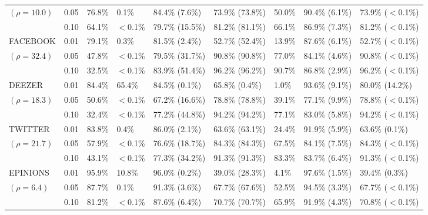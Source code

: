 \documentclass[a4paper,10pt]{article}
\theoremstyle{plain}
\begin{document}
{\begin{table}[h]
{\begin{tabular}{|ll|ll|lll|ll|}
				$(\rho=10.0)$& 0.05& 76.8\% & 0.1\%& 84.4\% (7.6\%) & 73.9\% (73.8\%) & 50.0\%& 90.4\% (6.1\%) & 73.9\% ($<$0.1\%)
				\\
				& 0.10& 64.1\% & $<$0.1\%& 79.7\% (15.5\%) & 81.2\% (81.1\%) & 66.1\%& 86.9\% (7.3\%) & 81.2\% ($<$0.1\%)
				\\
				FACEBOOK & 0.01& 79.1\% & 0.3\%& 81.5\% (2.4\%) & 52.7\% (52.4\%) & 13.9\%& 87.6\% (6.1\%) & 52.7\% ($<$0.1\%)
				\\
				$(\rho=32.4)$& 0.05& 47.8\% & $<$0.1\%& 79.5\% (31.7\%) & 90.8\% (90.8\%) & 77.0\%& 84.1\% (4.6\%) & 90.8\% ($<$0.1\%)
				\\
				& 0.10& 32.5\% & $<$0.1\%& 83.9\% (51.4\%) & 96.2\% (96.2\%) & 90.7\%& 86.8\% (2.9\%) & 96.2\% ($<$0.1\%)
				\\
				DEEZER   & 0.01& 84.4\% & 65.4\%& 84.5\% (0.1\%) & 65.8\% (0.4\%) & 1.0\%& 93.6\% (9.1\%) & 80.0\% (14.2\%)
				\\
				$(\rho=18.3)$& 0.05& 50.6\% & $<$0.1\%& 67.2\% (16.6\%) & 78.8\% (78.8\%) & 39.1\%& 77.1\% (9.9\%) & 78.8\% ($<$0.1\%)
				\\
				& 0.10& 32.4\% & $<$0.1\%& 77.2\% (44.8\%) & 94.2\% (94.2\%) & 77.1\%& 83.0\% (5.8\%) & 94.2\% ($<$0.1\%)
				\\
				TWITTER  & 0.01& 83.8\% & 0.4\%& 86.0\% (2.1\%) & 63.6\% (63.1\%) & 24.4\%& 91.9\% (5.9\%) & 63.6\% (0.1\%)
				\\
				$(\rho=21.7)$& 0.05& 57.9\% & $<$0.1\%& 76.6\% (18.7\%) & 84.3\% (84.3\%) & 67.5\%& 84.1\% (7.5\%) & 84.3\% ($<$0.1\%)
				\\
				& 0.10& 43.1\% & $<$0.1\%& 77.3\% (34.2\%) & 91.3\% (91.3\%) & 83.3\%& 83.7\% (6.4\%) & 91.3\% ($<$0.1\%)
				\\
				EPINIONS & 0.01& 95.9\% & 10.8\%& 96.0\% (0.2\%) & 39.0\% (28.3\%) & 4.1\%& 97.6\% (1.5\%) & 39.4\% (0.3\%)
				\\
				$(\rho=6.4)$& 0.05& 87.7\% & 0.1\%& 91.3\% (3.6\%) & 67.7\% (67.6\%) & 52.5\%& 94.5\% (3.3\%) & 67.7\% ($<$0.1\%)
				\\
				& 0.10& 81.2\% & $<$0.1\%& 87.6\% (6.4\%) & 70.7\% (70.7\%) & 65.9\%& 91.9\% (4.3\%) & 70.8\% ($<$0.1\%)
				\\
				\hline
		\end{tabular}}
	\end{table}
	
}
\end{document}
